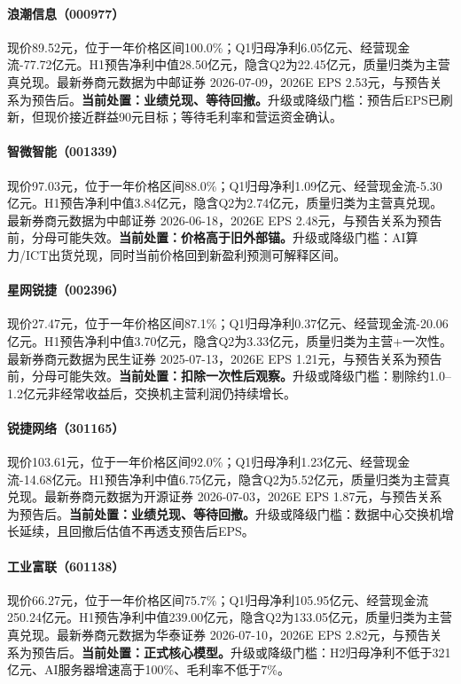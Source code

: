 \paragraph{浪潮信息（000977）}
现价89.52元，位于一年价格区间100.0\%；Q1归母净利6.05亿元、经营现金流-77.72亿元。H1预告净利中值28.50亿元，隐含Q2为22.45亿元，质量归类为主营真兑现。最新券商元数据为中邮证券 2026-07-09，2026E EPS 2.53元，与预告关系为预告后。\textbf{当前处置：业绩兑现、等待回撤。}升级或降级门槛：预告后EPS已刷新，但现价接近群益90元目标；等待毛利率和营运资金确认。

\paragraph{智微智能（001339）}
现价97.03元，位于一年价格区间88.0\%；Q1归母净利1.09亿元、经营现金流-5.30亿元。H1预告净利中值3.84亿元，隐含Q2为2.74亿元，质量归类为主营真兑现。最新券商元数据为中邮证券 2026-06-18，2026E EPS 2.48元，与预告关系为预告前，分母可能失效。\textbf{当前处置：价格高于旧外部锚。}升级或降级门槛：AI算力/ICT出货兑现，同时当前价格回到新盈利预测可解释区间。

\paragraph{星网锐捷（002396）}
现价27.47元，位于一年价格区间87.1\%；Q1归母净利0.37亿元、经营现金流-20.06亿元。H1预告净利中值3.70亿元，隐含Q2为3.33亿元，质量归类为主营+一次性。最新券商元数据为民生证券 2025-07-13，2026E EPS 1.21元，与预告关系为预告前，分母可能失效。\textbf{当前处置：扣除一次性后观察。}升级或降级门槛：剔除约1.0--1.2亿元非经常收益后，交换机主营利润仍持续增长。

\paragraph{锐捷网络（301165）}
现价103.61元，位于一年价格区间92.0\%；Q1归母净利1.23亿元、经营现金流-14.68亿元。H1预告净利中值6.75亿元，隐含Q2为5.52亿元，质量归类为主营真兑现。最新券商元数据为开源证券 2026-07-03，2026E EPS 1.87元，与预告关系为预告后。\textbf{当前处置：业绩兑现、等待回撤。}升级或降级门槛：数据中心交换机增长延续，且回撤后估值不再透支预告后EPS。

\paragraph{工业富联（601138）}
现价66.27元，位于一年价格区间75.7\%；Q1归母净利105.95亿元、经营现金流250.24亿元。H1预告净利中值239.00亿元，隐含Q2为133.05亿元，质量归类为主营真兑现。最新券商元数据为华泰证券 2026-07-10，2026E EPS 2.82元，与预告关系为预告后。\textbf{当前处置：正式核心模型。}升级或降级门槛：H2归母净利不低于321亿元、AI服务器增速高于100\%、毛利率不低于7\%。



